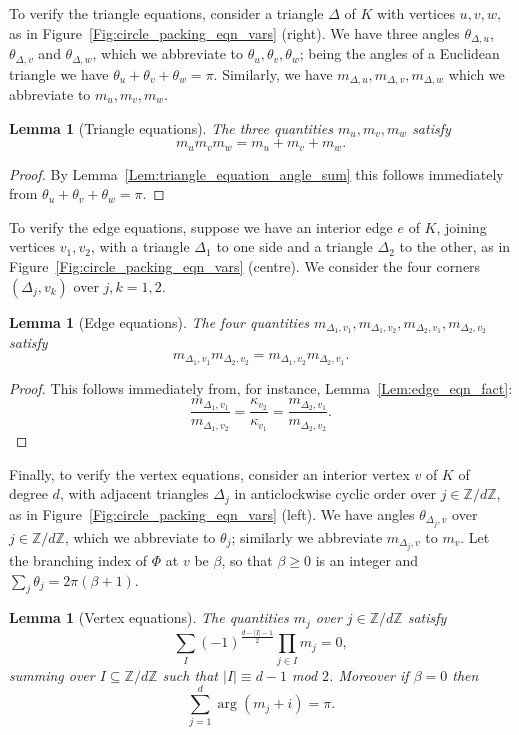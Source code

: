 \documentclass[12pt]{amsart}
\numberwithin{equation}{section}
\newtheorem{lem}[equation]{Lemma}
\theoremstyle{named}
\newcommand{\reffig}[1]{Figure~\ref{Fig:#1}}
\newcommand{\reflem}[1]{Lemma~\ref{Lem:#1}}
\newcommand{\Z}{\mathbb{Z}}
\begin{document}
 To verify the triangle equations, consider
a triangle $\Delta$ of $K$ with vertices $u,v,w,$ as in \reffig{circle_packing_eqn_vars} (right). We have three angles $\theta_{\Delta,u}$, $\theta_{\Delta,v}$ and $\theta_{\Delta,w}$, which we abbreviate to $\theta_u, \theta_v, \theta_w$; being the angles of a Euclidean triangle we have $\theta_u + \theta_v + \theta_w = \pi$. Similarly, we have $m_{\Delta, u}, m_{\Delta,v}, m_{\Delta,w}$ which we abbreviate to $m_u, m_v, m_w$.

\begin{lem}[Triangle equations]
\label{Lem:triangle_eqns}
The three quantities $m_u, m_v, m_w$ satisfy
\[
\label{Eqn:triangle_equation}
m_u m_v m_w = m_u + m_v + m_w.
\]
\end{lem}

\begin{proof}
By \reflem{triangle_equation_angle_sum} this follows immediately from $\theta_u + \theta_v + \theta_w = \pi$.
\end{proof}

 To verify the edge equations,
suppose we have an interior edge $e$ of $K$, joining vertices $v_1,v_2$, with a triangle $\Delta_1$ to one side and a triangle $\Delta_2$ to the other, as in \reffig{circle_packing_eqn_vars} (centre). We consider the four corners $(\Delta_j, v_k)$ over $j,k=1,2$. 
\begin{lem}[Edge equations]
\label{Lem:edge_eqns}
The four quantities $m_{\Delta_1,v_1}, m_{\Delta_1,v_2}, m_{\Delta_2, v_1}, m_{\Delta_2, v_2}$ satisfy
\begin{equation}
\label{Eqn:edge_eqn}
m_{\Delta_1, v_1} m_{\Delta_2, v_2} = m_{\Delta_1, v_2} m_{\Delta_2, v_1}.
\end{equation}
\end{lem}

\begin{proof}
This follows immediately from, for instance, \reflem{edge_eqn_fact}:
\[
\frac{m_{\Delta_1,v_1}}{m_{\Delta_1,v_2}} = \frac{\kappa_{v_2}}{\kappa_{v_1}}
= \frac{m_{\Delta_2,v_1}}{m_{\Delta_2,v_2}}.
\]
\end{proof}

Finally, to verify the vertex equations, consider an interior vertex $v$ of $K$ of degree $d$, with adjacent triangles $\Delta_j$ in anticlockwise cyclic order over $j \in \Z/d\Z$, as in \reffig{circle_packing_eqn_vars} (left). We have angles $\theta_{\Delta_j,v}$ over $j \in \Z/d\Z$, which we abbreviate to $\theta_j$; similarly we abbreviate $m_{\Delta_j,v}$ to $m_v$. Let the branching index of $\Phi$ at $v$ be $\beta$, so that $\beta \geq 0$ is an integer and $\sum_{j} \theta_j = 2 \pi (\beta + 1)$.
\begin{lem}[Vertex equations]
\label{Lem:vertex_eqns}
The quantities $m_j$ over $j \in \Z/d\Z$ satisfy
\[
\sum_{I} (-1)^{\frac{ d-|I|-1 }{2} } \prod_{j \in I} m_{j} = 0,
\]
summing over $I \subseteq \Z/d\Z$ such that $|I| \equiv d-1$ mod $2$. Moreover if $\beta = 0$ then
\[
\label{Eqn:vertex_eqn_arg_version}
\sum_{j=1}^d \arg \left( m_{j} + i \right) = \pi.
\]
\end{lem}
\end{document}
